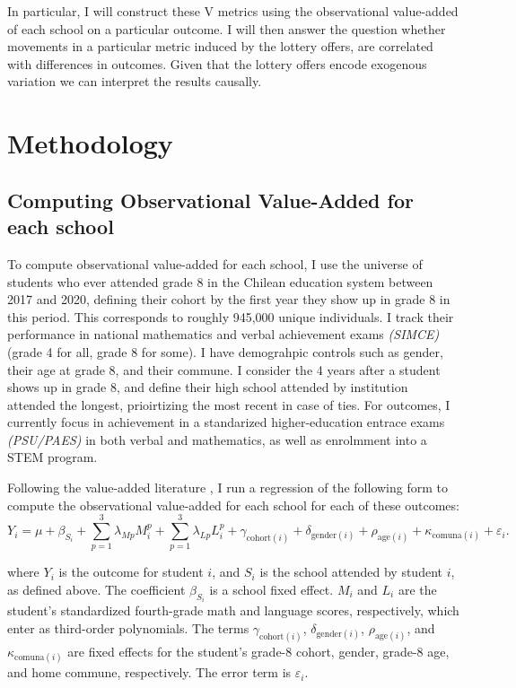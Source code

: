 \documentclass[a4paper, article, english, oneside, unknownkeysallowed, 12pt]{memoir}
\begin{document}
In particular, I will construct these V metrics using the observational value-added of each school on a particular outcome. 
I will then answer the question whether movements in a particular metric induced by the lottery offers, are correlated with differences in outcomes.
Given that the lottery offers encode exogenous variation we can interpret the results causally. 


\section{Methodology}
  \subsection{Computing Observational Value-Added for each school}

To compute observational value-added for each school, I use the universe of students who ever attended grade 8 in the Chilean education system between 2017 and 2020, defining their cohort by the first year they show up in grade 8 in this period.
 This corresponds to roughly 945,000 unique individuals. I track their performance in national mathematics and verbal achievement exams \textit{(SIMCE)} (grade 4 for all, grade 8 for some). I have demograhpic controls such as gender, their age at grade 8, and their commune. 
 I consider the 4 years after a student shows up in grade 8, and define their high school attended by institution attended the longest, prioirtizing the most recent in case of ties. For outcomes, I currently focus in achievement in a standarized higher-education entrace exams \textit{(PSU/PAES)} in both verbal and mathematics, as well as enrolmment into a STEM program. 



Following the value-added literature \parencite{chetty_measuring_2014,angrist_leveraging_2017}, I run a regression of the following form to compute the observational value-added for each school for each of these outcomes:
\[ Y_i = \mu + \beta_{S_i}  + \sum_{p=1}^{3} \lambda_{Mp} M_i^p + \sum_{p=1}^{3} \lambda_{Lp} L_i^p 
+ \gamma_{\mathrm{cohort}(i)} + \delta_{\mathrm{gender}(i)} + \rho_{\mathrm{age}(i)} + \kappa_{\mathrm{comuna}(i)}
+ \varepsilon_i .
\]

where \(Y_i\) is the outcome for student \(i\), and \(S_i\) is the school attended by student \(i\), as defined above. The coefficient \(\beta_{S_i}\) is a school fixed effect. \(M_i\) and \(L_i\) are the student's standardized fourth-grade math and language scores, respectively, which enter as third-order polynomials. The terms \(\gamma_{\mathrm{cohort}(i)}\), \(\delta_{\mathrm{gender}(i)}\), \(\rho_{\mathrm{age}(i)}\), and \(\kappa_{\mathrm{comuna}(i)}\) are fixed effects for the student's grade-8 cohort, gender, grade-8 age, and home commune, respectively. The error term is \(\varepsilon_i\).
\end{document}
